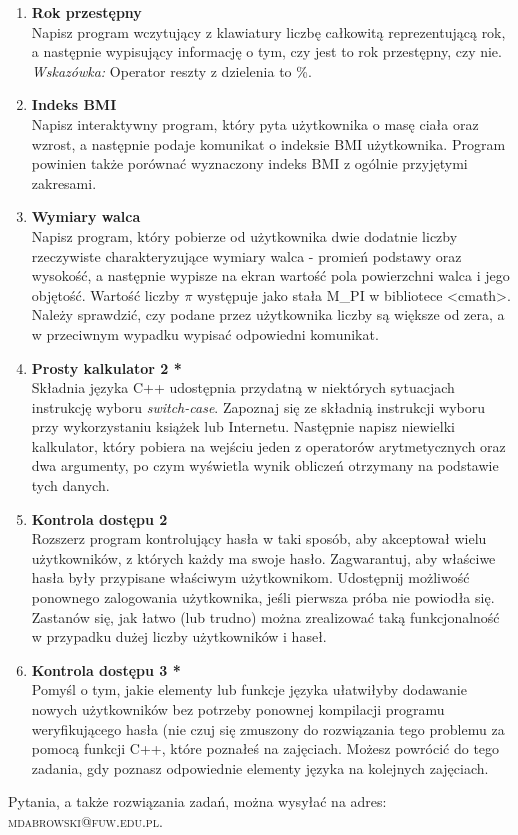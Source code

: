 \documentclass[12pt]{article}
\begin{document}
\begin{enumerate}
\newpage
{}

\item \textbf{Rok przestępny}\\
Napisz program wczytujący z klawiatury liczbę całkowitą reprezentującą rok, a następnie wypisujący informację o tym, czy jest to rok przestępny, czy nie. \textit{Wskazówka:} Operator reszty z dzielenia to \%.

\item \textbf{Indeks BMI}\\
Napisz interaktywny program, który pyta użytkownika o masę ciała oraz wzrost, a następnie podaje komunikat o indeksie BMI użytkownika. Program powinien także porównać wyznaczony indeks BMI z ogólnie przyjętymi zakresami.

\item \textbf{Wymiary walca}\\
Napisz program, który pobierze od użytkownika dwie dodatnie liczby rzeczywiste charakteryzujące wymiary walca - promień podstawy oraz wysokość, a następnie wypisze na ekran wartość pola powierzchni walca i jego objętość. Wartość liczby $\pi$ występuje jako stała M\_PI w bibliotece <cmath>. Należy sprawdzić, czy podane przez użytkownika liczby są większe od zera, a w przeciwnym wypadku wypisać odpowiedni komunikat.

\item \textbf{Prosty kalkulator 2 *}\\
Składnia języka C++ udostępnia przydatną w niektórych sytuacjach instrukcję wyboru \textit{switch-case}. Zapoznaj się ze składnią instrukcji wyboru przy wykorzystaniu książek lub Internetu. Następnie napisz niewielki kalkulator, który pobiera na wejściu jeden z operatorów arytmetycznych oraz dwa argumenty, po czym wyświetla wynik obliczeń otrzymany na podstawie tych danych.

\item \textbf{Kontrola dostępu 2}\\
Rozszerz program kontrolujący hasła w taki sposób, aby akceptował wielu użytkowników, z których każdy ma swoje hasło. Zagwarantuj, aby właściwe hasła były przypisane właściwym użytkownikom. Udostępnij możliwość ponownego zalogowania użytkownika, jeśli pierwsza próba nie powiodła się. Zastanów się, jak łatwo (lub trudno) można zrealizować taką funkcjonalność w przypadku dużej liczby użytkowników i haseł.

\item \textbf{Kontrola dostępu 3 *}\\
Pomyśl o tym, jakie elementy lub funkcje języka ułatwiłyby dodawanie nowych użytkowników bez potrzeby ponownej kompilacji programu weryfikującego hasła (nie czuj się zmuszony do rozwiązania tego problemu za pomocą funkcji C++, które poznałeś na zajęciach. Możesz powrócić do tego zadania, gdy poznasz odpowiednie elementy języka na kolejnych zajęciach.

\end{enumerate}
\vspace{1cm}
\small Pytania, a także rozwiązania zadań, można wysyłać na adres: \textsc{mdabrowski@fuw.edu.pl}.
\end{document}
